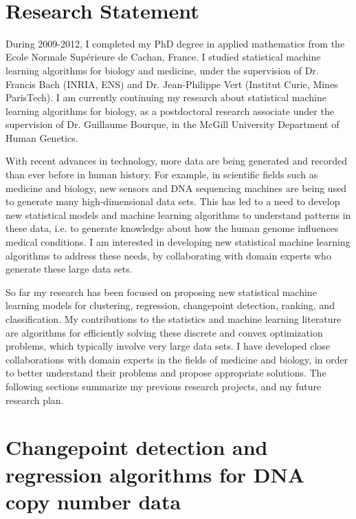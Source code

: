 \documentclass{article}
\begin{document}
 \mbox{ }

\section*{\centering Research Statement}

During 2009-2012, I completed my PhD degree in applied mathematics
from the Ecole Normale Sup\'erieure de Cachan, France. I studied
statistical machine learning algorithms for biology and medicine, under the
supervision of Dr. Francis Bach (INRIA, ENS) and Dr. Jean-Philippe
Vert (Institut Curie, Mines ParisTech). I am currently continuing my
research about statistical machine learning algorithms for biology, as a
postdoctoral research associate under the supervision of Dr. Guillaume
Bourque, in the McGill University Department of Human Genetics.

With recent advances in technology, more data are being generated and
recorded than ever before in human history. For example, in scientific
fields such as medicine and biology, new sensors and DNA sequencing
machines are being used to generate many high-dimensional data
sets. This has led to a need to develop new statistical models and
machine learning algorithms to understand patterns in these data, i.e.
to generate knowledge about how the human genome influences medical
conditions. I am interested in developing new statistical machine
learning algorithms to address these needs, by collaborating with
domain experts who generate these large data sets.

So far my research has been focused on proposing new statistical
machine learning models for clustering, regression, changepoint
detection, ranking, and classification. My contributions to the
statistics and machine learning literature are algorithms for
efficiently solving these discrete and convex optimization problems,
which typically involve very large data sets. I have developed close
collaborations with domain experts in the fields of medicine and
biology, in order to better understand their problems and propose
appropriate solutions. The following sections summarize my previous
research projects, and my future research plan.

\section{Changepoint detection and regression algorithms for DNA copy
  number data}
\end{document}
